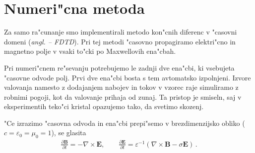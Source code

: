 \documentclass[a4paper,10pt]{article}
\newcommand{\todo}[1]{(\textbf{\textsmaller{TODO}: #1})}
\newcommand{\odvod}[2]{\frac{\partial #1}{\partial #2}}
\renewcommand{\vec}{\mathbf}
\newcommand{\eps}{\varepsilon}
\newcommand{\angl}[1]{(\textit{angl. #1})}
\renewcommand{\acf}[1]{\aclu{#1} -- \acs{#1}}
\begin{document}

\section{Numeri"cna metoda}

Za samo ra"cunanje smo implementirali metodo kon"cnih diferenc v "casovni domeni \angl{\acf{FDTD}}\cite{taflove}. 
Pri tej metodi "casovno propagiramo elektri"cno in magnetno polje v vsaki to"cki po Maxwellovih ena"cbah. 

Pri numeri"cnem re"sevanju potrebujemo le zadnji dve ena"cbi, ki vsebujeta "casovne odvode polj. 
Prvi dve ena"cbi bosta s tem avtomatsko izpolnjeni. 
Izvore valovanja namesto z dodajanjem nabojev in tokov v vzorec raje simuliramo z robnimi pogoji, kot da valovanje prihaja od zunaj. 
Ta pristop je smiseln, saj v eksperimentih teko"ci kristal opazujemo tako, da svetimo skozenj. 

"Ce izrazimo "casovna odvoda in ena"cbi prepi"semo v brezdimenzijsko obliko ($c = \varepsilon_0 = \mu_0 = 1$), se glasita
\begin{align}
\label{eq:maxwell-base}
 \odvod{\vec{B}}{t} = -\nabla \times \vec{E}, \qquad \odvod{\vec{E}}{t} = \eps^{-1} (\nabla \times \vec{B} - \sigma \vec E)\,.
\end{align}
\end{document}

